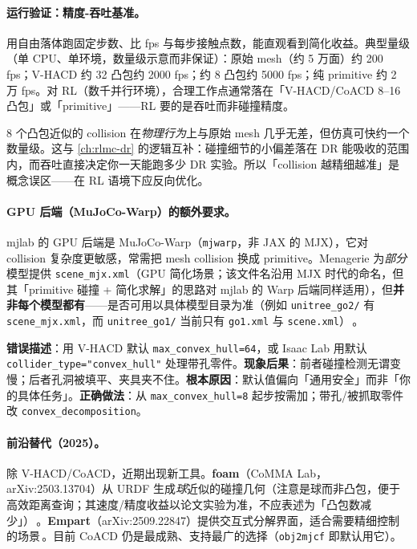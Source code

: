 \paragraph{运行验证：精度-吞吐基准。}用自由落体跑固定步数、比 fps 与每步接触点数，能直观看到简化收益。典型量级（单 CPU、单环境，数量级示意而非保证）：原始 mesh（约 5 万面）约 200 fps；V-HACD 约 32 凸包约 2000 fps；约 8 凸包约 5000 fps；纯 primitive 约 2 万 fps。对 RL（数千并行环境），合理工作点通常落在「V-HACD/CoACD 8--16 凸包」或「primitive」——RL 要的是吞吐而非碰撞精度。

\begin{insight}[对 RL，碰撞精度远不如吞吐重要]\label{ins:rlmc-assets-throughput}
8 个凸包近似的 collision 在\emph{物理行为}上与原始 mesh 几乎无差，但仿真可快约一个数量级。这与 \cref{ch:rlmc-dr} 的逻辑互补：碰撞细节的小偏差落在 DR 能吸收的范围内，而吞吐直接决定你一天能跑多少 DR 实验。所以「collision 越精细越准」是概念误区——在 RL 语境下应反向优化。
\end{insight}

\paragraph{GPU 后端（MuJoCo-Warp）的额外要求。}mjlab 的 GPU 后端是 MuJoCo-Warp（\texttt{mjwarp}，非 JAX 的 MJX），它对 collision 复杂度更敏感，常需把 mesh collision 换成 primitive。Menagerie 为\emph{部分}模型提供 \texttt{scene\_mjx.\allowbreak xml}（GPU 简化场景；该文件名沿用 MJX 时代的命名，但其「primitive 碰撞 + 简化求解」的思路对 mjlab 的 Warp 后端同样适用），但\textbf{并非每个模型都有}——是否可用以具体模型目录为准（例如 \texttt{unitree\_go2/\allowbreak } 有 \texttt{scene\_mjx.\allowbreak xml}，而 \texttt{unitree\_go1/\allowbreak } 当前只有 \texttt{go1.xml} 与 \texttt{scene.xml}）\,\cite{menagerie2022}。

\begin{pitfall}
\textbf{错误描述}：用 V-HACD 默认 \texttt{max\_convex\_hull=64}，或 Isaac Lab 用默认 \texttt{collider\_type="convex\_hull"} 处理带孔零件。\textbf{现象后果}：前者碰撞检测无谓变慢；后者孔洞被填平、夹具夹不住。\textbf{根本原因}：默认值偏向「通用安全」而非「你的具体任务」。\textbf{正确做法}：从 \texttt{max\_convex\_hull=8} 起步按需加；带孔/被抓取零件改 \texttt{convex\_decomposition}。
\end{pitfall}

\paragraph{前沿替代（2025）。}除 V-HACD/CoACD，近期出现新工具。\textbf{foam}（CoMMA Lab，arXiv:2503.13704）从 URDF 生成\emph{球}近似的碰撞几何（注意是球而非凸包，便于高效距离查询；其速度/精度收益以论文实验为准，不应表述为「凸包数减少」）\,\cite{foam2025}。\textbf{Empart}（arXiv:2509.22847）提供交互式分解界面，适合需要精细控制的场景\,\cite{empart2025}。目前 CoACD 仍是最成熟、支持最广的选择（\texttt{obj2mjcf} 即默认用它）。

